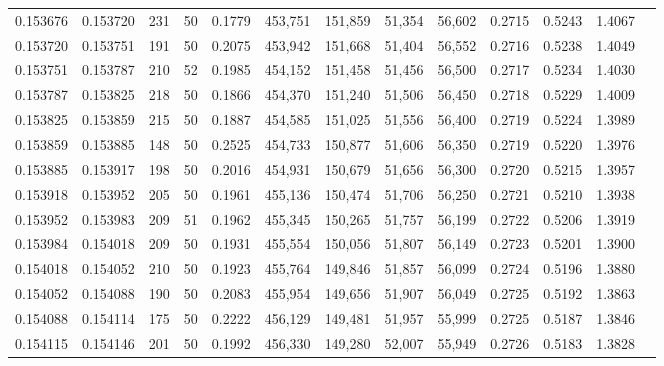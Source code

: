 \begin{tabular}{rrrrrrrrrrrrr}
0.153676 & 0.153720 &   231 &  50 &                                     0.1779 & 453,751 & 151,859 &  51,354 &  56,602 & 0.2715 & 0.5243 & 1.4067 \\
0.153720 & 0.153751 &   191 &  50 &                                     0.2075 & 453,942 & 151,668 &  51,404 &  56,552 & 0.2716 & 0.5238 & 1.4049 \\
0.153751 & 0.153787 &   210 &  52 &                                     0.1985 & 454,152 & 151,458 &  51,456 &  56,500 & 0.2717 & 0.5234 & 1.4030 \\
0.153787 & 0.153825 &   218 &  50 &                                     0.1866 & 454,370 & 151,240 &  51,506 &  56,450 & 0.2718 & 0.5229 & 1.4009 \\
0.153825 & 0.153859 &   215 &  50 &                                     0.1887 & 454,585 & 151,025 &  51,556 &  56,400 & 0.2719 & 0.5224 & 1.3989 \\
0.153859 & 0.153885 &   148 &  50 &                                     0.2525 & 454,733 & 150,877 &  51,606 &  56,350 & 0.2719 & 0.5220 & 1.3976 \\
0.153885 & 0.153917 &   198 &  50 &                                     0.2016 & 454,931 & 150,679 &  51,656 &  56,300 & 0.2720 & 0.5215 & 1.3957 \\
0.153918 & 0.153952 &   205 &  50 &                                     0.1961 & 455,136 & 150,474 &  51,706 &  56,250 & 0.2721 & 0.5210 & 1.3938 \\
0.153952 & 0.153983 &   209 &  51 &                                     0.1962 & 455,345 & 150,265 &  51,757 &  56,199 & 0.2722 & 0.5206 & 1.3919 \\
0.153984 & 0.154018 &   209 &  50 &                                     0.1931 & 455,554 & 150,056 &  51,807 &  56,149 & 0.2723 & 0.5201 & 1.3900 \\
0.154018 & 0.154052 &   210 &  50 &                                     0.1923 & 455,764 & 149,846 &  51,857 &  56,099 & 0.2724 & 0.5196 & 1.3880 \\
0.154052 & 0.154088 &   190 &  50 &                                     0.2083 & 455,954 & 149,656 &  51,907 &  56,049 & 0.2725 & 0.5192 & 1.3863 \\
0.154088 & 0.154114 &   175 &  50 &                                     0.2222 & 456,129 & 149,481 &  51,957 &  55,999 & 0.2725 & 0.5187 & 1.3846 \\
0.154115 & 0.154146 &   201 &  50 &                                     0.1992 & 456,330 & 149,280 &  52,007 &  55,949 & 0.2726 & 0.5183 & 1.3828 \\

\end{tabular}
